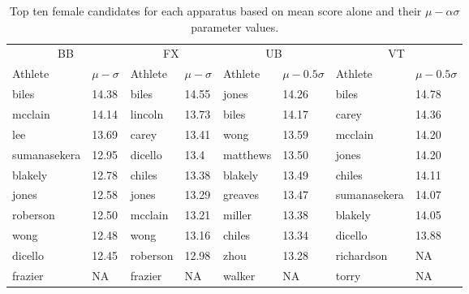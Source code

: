 \documentclass[12pt]{article}
\begin{document}
\begin{table}
  \caption{Top ten female candidates for each apparatus based on mean score alone and 
  their $\mu - \alpha \sigma$ parameter values.}
  \label{tab:tableBBP}
\centering
\begin{tabular}[t]{llllllll}
 \toprule
  \multicolumn{2}{c}{BB} & \multicolumn{2}{c}{FX} & \multicolumn{2}{c}{UB} & \multicolumn{2}{c}{VT}\\
  \cmidrule(lr){1-2}\cmidrule(lr){3-4}\cmidrule(lr){5-6}\cmidrule(lr){7-8}
Athlete & $\mu - \sigma$ & Athlete & $\mu - \sigma$ & Athlete & $\mu - 0.5 \sigma$ & Athlete & $\mu - 0.5 \sigma$\\
\midrule
biles & 14.38 & biles & 14.55 & jones & 14.26 & biles & 14.78\\

mcclain & 14.14 & lincoln & 13.73 & biles & 14.17 & carey & 14.36\\

lee & 13.69 & carey & 13.41 & wong & 13.59 & mcclain & 14.20\\

sumanasekera & 12.95 & dicello & 13.4 & matthews & 13.50 & jones & 14.20\\

blakely & 12.78 & chiles & 13.38 & blakely & 13.49 & chiles & 14.11\\

jones & 12.58 & jones & 13.29 & greaves & 13.47 & sumanasekera & 14.07\\

roberson & 12.50 & mcclain & 13.21 & miller & 13.38 & blakely & 14.05\\

wong & 12.48 & wong & 13.16 & chiles & 13.34 & dicello & 13.88\\

dicello & 12.45 & roberson & 12.98 & zhou & 13.28 & richardson & NA\\

frazier & NA & frazier & NA & walker & NA & torry & NA\\
\bottomrule
\end{tabular}
\end{table}
\end{document}
